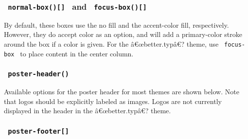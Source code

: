\subsubsection{\texorpdfstring{\texttt{\ normal-box(){[}{]}\ } and
\texttt{\ focus-box(){[}{]}\ }}{ normal-box(){[}{]}  and  focus-box(){[}{]} }}\label{normal-box-and-focus-box}

By default, these boxes use the no fill and the accent-color fill,
respectively. However, they do accept color as an option, and will add a
primary-color stroke around the box if a color is given. For the
â€œbetter.typâ€? theme, use \texttt{\ focus-box\ } to place content in
the center column.

\begin{Shaded}
\begin{Highlighting}[]
\NormalTok{\#normal{-}box(color: none)[}
\NormalTok{]}

\NormalTok{\#focus{-}box(color: none)[}
\NormalTok{]}
\end{Highlighting}
\end{Shaded}

\subsubsection{\texorpdfstring{\texttt{\ poster-header()\ }}{ poster-header() }}\label{poster-header}

Available options for the poster header for most themes are shown below.
Note that logos should be explicitly labeled as images. Logos are not
currently displayed in the header in the â€œbetter.typâ€? theme.

\begin{Shaded}
\begin{Highlighting}[]
\NormalTok{)}
\end{Highlighting}
\end{Shaded}

\subsubsection{\texorpdfstring{\texttt{\ poster-footer{[}{]}\ }}{ poster-footer{[}{]} }}\label{poster-footer}

